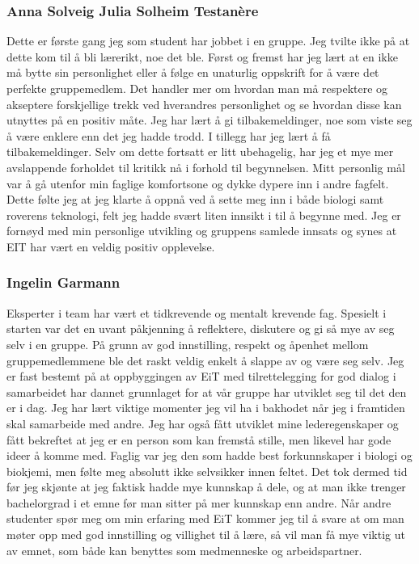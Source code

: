 \subsubsection{Anna Solveig Julia Solheim Testan\`{e}re}
Dette er første gang jeg som student har jobbet i en gruppe.
Jeg tvilte ikke på at dette kom til å bli lærerikt, noe det ble.
Først og fremst har jeg lært at en ikke må bytte sin personlighet eller å følge en unaturlig oppskrift for å være det perfekte gruppemedlem. 
Det handler mer om hvordan man må respektere og akseptere forskjellige trekk ved hverandres personlighet og se hvordan disse kan utnyttes på en positiv måte. 
Jeg har lært å gi tilbakemeldinger, noe som viste seg å være enklere enn det jeg hadde trodd.
I tillegg har jeg lært å få tilbakemeldinger. 
Selv om dette fortsatt er litt ubehagelig, har jeg et mye mer avslappende forholdet til kritikk nå i forhold til begynnelsen. 
Mitt personlig mål var å gå utenfor min faglige komfortsone og dykke dypere inn i andre fagfelt. 
Dette følte jeg at jeg klarte å oppnå ved å sette meg inn i både biologi samt roverens teknologi, felt jeg hadde svært liten innsikt i til å begynne med.
Jeg er fornøyd med min personlige utvikling og gruppens samlede innsats og synes at EIT har vært en veldig positiv opplevelse. 
\\
\subsubsection{Ingelin Garmann}
Eksperter i team har vært et tidkrevende og mentalt krevende fag. 
Spesielt i starten var det en uvant påkjenning å reflektere, diskutere og gi så mye av seg selv i en gruppe. 
På grunn av god innstilling, respekt og åpenhet mellom gruppemedlemmene ble det raskt veldig enkelt å slappe av og være seg selv.
Jeg er fast bestemt på at oppbyggingen av EiT med tilrettelegging for god dialog i samarbeidet har dannet grunnlaget for at vår gruppe har utviklet seg til det den er i dag.
Jeg har lært viktige momenter jeg vil ha i bakhodet når jeg i framtiden skal samarbeide med andre.
Jeg har også fått utviklet mine lederegenskaper og fått bekreftet at jeg er en person som kan fremstå stille, men likevel har gode ideer å komme med.
Faglig var jeg den som hadde best forkunnskaper i biologi og biokjemi, men følte meg absolutt ikke selvsikker innen feltet.
Det tok dermed tid før jeg skjønte at jeg faktisk hadde mye kunnskap å dele, og at man ikke trenger bachelorgrad i et emne før man sitter på mer kunnskap enn andre.
Når andre studenter spør meg om min erfaring med EiT kommer jeg til å svare at om man møter opp med god innstilling og villighet til å lære, så vil man få mye viktig ut av emnet, som både kan benyttes som medmenneske og arbeidspartner.
\\
